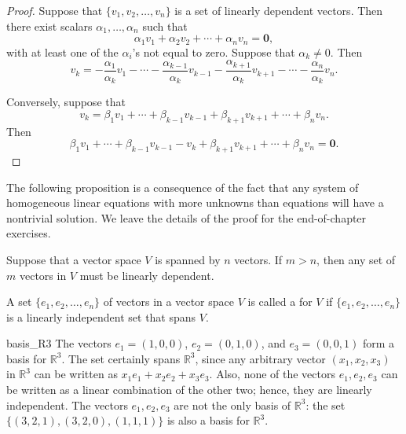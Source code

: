 \begin{proof}
Suppose that $\{ v_1, v_2, \dots, v_n \}$ is a set of linearly dependent
vectors.  Then there exist scalars $\alpha_1, \ldots, \alpha_n$
such that
\[
\alpha_1 v_1 + \alpha_2 v_2 + \cdots + \alpha_n v_n = {\mathbf 0 },
\]
with at least one of the $\alpha_i$'s not equal to zero.  Suppose that
$\alpha_k \neq 0$. Then 
\[
v_k = - \frac{\alpha_1}{\alpha_k} v_1 
- \cdots 
- \frac{\alpha_{k-1}}{\alpha_k}	v_{k-1}
- \frac{\alpha_{k+1}}{\alpha_k}	v_{k+1}
- \cdots 
- \frac{\alpha_n}{\alpha_k} v_n.
\]


Conversely, suppose that 
\[
v_k = \beta_1 v_1 
+ \cdots 
+ \beta_{k-1} v_{k-1}
+ \beta_{k+1} v_{k+1}
+ \cdots 
+ \beta_n v_n.
\]
Then
\[
\beta_1 v_1 
+ \cdots 
+ \beta_{k-1} v_{k-1}
- v_k
+ \beta_{k+1} v_{k+1}
+ \cdots 
+ \beta_n v_n = {\mathbf 0}.
\]
\end{proof}

\medskip


The following proposition is a consequence of the fact that any system
of homogeneous linear equations with more unknowns than equations will
have a nontrivial solution.  We leave the details of the proof for the
end-of-chapter exercises. 
 

\begin{proposition}\label{vect:linearlyindependent}
Suppose that a vector space $V$ is spanned by $n$ vectors. If $m > n$,
then any set of $m$ vectors in $V$ must be linearly dependent. 
\end{proposition}
 
  
A set $\{ e_1, e_2, \ldots, e_n \}$ of vectors in a vector space $V$
is called a  for $V$ if $\{
e_1, e_2, \ldots, e_n \}$ is a linearly independent set that spans
$V$.

 
 
\begin{example}{basis_R3}
The vectors $e_1 = (1, 0, 0)$, $e_2 = (0, 1, 0)$, and $e_3 =(0, 0, 1)$
form a basis for ${\mathbb R}^3$.  The set certainly spans ${\mathbb R}^3$,
since any arbitrary vector $(x_1, x_2, x_3)$ in ${\mathbb R}^3$ can be
written as $x_1 e_1 + x_2 e_2 + x_3 e_3$. Also, none of the vectors
$e_1, e_2, e_3$ can be written as a linear combination of the other
two; hence, they are linearly independent.  The vectors $e_1, e_2,
e_3$ are not the only basis of ${\mathbb R}^3$:  the set $\{ (3, 2, 1),
(3, 2, 0), (1, 1, 1) \}$ is also a basis for ${\mathbb R}^3$. 
\end{example}

